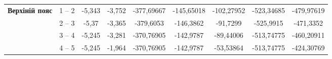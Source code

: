 \documentclass[a4paper,14pt]{article}
\begin{document}
\begin{landscape}
\begin{center}
\begin{table}[]
\begin{tabular}{|c|c|c|c|c|c|c|c|c|}
    \multirow{6}{*}{\textbf{Верхіній пояс}}  & 1 – 2                                & -5,343                                                                            & -3,752                                                                           & -377,69667                                                                                                       & -145,65018                                                                         & -102,27952                                                                         & -523,34685                    & -479,97619                    \\ \cline{2-9} 
                                             & 2 – 3                                & -5,37                                                                             & -3,365                                                                           & -379,6053                                                                                                        & -146,3862                                                                          & -91,7299                                                                           & -525,9915                     & -471,3352                     \\ \cline{2-9} 
                                             & 3 – 4                                & -5,245                                                                            & -3,281                                                                           & -370,76905                                                                                                       & -142,9787                                                                          & -89,44006                                                                          & -513,74775                    & -460,20911                    \\ \cline{2-9} 
                                             & 4 – 5                                & -5,245                                                                            & -1,964                                                                           & -370,76905                                                                                                       & -142,9787                                                                          & -53,53864                                                                          & -513,74775                    & -424,30769                    \\ \cline{2-9} 

\end{tabular}
\end{table}
\end{center}
\end{landscape}
\end{document}
